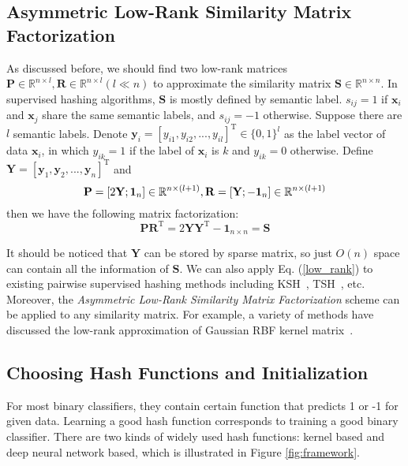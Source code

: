 \documentclass[conference]{IEEEtran}
\begin{document}
\subsection{Asymmetric Low-Rank Similarity Matrix Factorization}

As discussed before, we should find two low-rank matrices $\mathbf{P} \in \mathbb{R}^{n \times l}, \mathbf{R} \in \mathbb{R}^{n \times l}(l \ll n)$ to approximate the similarity matrix $\mathbf{S} \in \mathbb{R}^{n \times n}$. In supervised hashing algorithms, $\mathbf{S}$ is mostly defined by semantic label. $s_{ij}=1$ if $\mathbf{x}_i$ and $\mathbf{x}_j$ share the same semantic labels, and $s_{ij}=-1$ otherwise. Suppose there are $l$ semantic labels. Denote $\mathbf{y}_i = [y_{i1},y_{i2},...,y_{il}]^\mathrm{T} \in \{0,1\}^l$ as the label vector of data $\mathbf{x}_i$, in which $y_{ik}=1$ if the label of $\mathbf{x}_i$ is $k$ and $y_{ik}=0$ otherwise. Define $\mathbf{Y}=[\mathbf{y}_1,\mathbf{y}_2,...,\mathbf{y}_n]^\mathrm{T}$ and 
\begin{equation}
\mathbf{P} = [2\mathbf{Y}; \mathbf{1}_{n \time 1}] \in \mathbb{R}^{n \times (l+1)}, \mathbf{R} = [\mathbf{Y}; -\mathbf{1}_{n \time 1}] \in \mathbb{R}^{n \times (l+1)}
\label{factor}
\end{equation}
then we have the following matrix factorization:
\begin{equation}
\mathbf{P} \mathbf{R}^\mathrm{T} = 2 \mathbf{Y} \mathbf{Y}^\mathrm{T} - \mathbf{1}_{n \times n} = \mathbf{S}
\label{low_rank}
\end{equation}

It should be noticed that $\mathbf{Y}$ can be stored by sparse matrix, so just $O(n)$ space can contain all the information of $\mathbf{S}$. We can also apply Eq. (\ref{low_rank}) to existing pairwise supervised hashing methods including KSH~\cite{liu2012supervised}, TSH~\cite{lin2013general}, etc. Moreover, the {\em Asymmetric Low-Rank Similarity Matrix Factorization} scheme can be applied to any similarity matrix. For example, a variety of methods have discussed the low-rank approximation of Gaussian RBF kernel matrix~\cite{liu2011hashing,zhang2008improved}.

\subsection{Choosing Hash Functions and Initialization}
\label{k_hash_func}

For most binary classifiers, they contain certain function that predicts 1 or -1 for given data. Learning a good hash function corresponds to training a good binary classifier. There are two kinds of widely used hash functions: kernel based and deep neural network based, which is illustrated in Figure \ref{fig:framework}.
\end{document}
